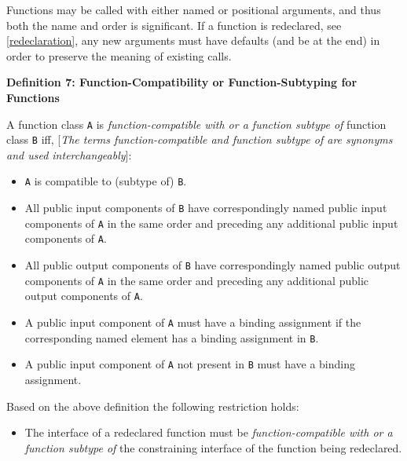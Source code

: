 \begin{nonnormative}
Functions may be called with either named or positional
arguments, and thus both the name and order is significant. If a
function is redeclared, see \autoref{redeclaration}, any new arguments must
have defaults (and be at the end) in order to preserve the meaning of
existing calls.
\end{nonnormative}

\textbf{Definition 7: Function-Compatibility or Function-Subtyping for Functions}

A function class \lstinline!A! is \emph{function-compatible with or a function
subtype of} function class \lstinline!B! iff, {[}\emph{The terms function-compatible
and function subtype of are synonyms and used interchangeably}{]}:
\begin{itemize}
\item
  \lstinline!A! is compatible to (subtype of) \lstinline!B!.
\item
  All public input components of \lstinline!B! have correspondingly named public
  input components of \lstinline!A! in the same order and preceding any additional
  public input components of \lstinline!A!.
\item
  All public output components of \lstinline!B! have correspondingly named public
  output components of \lstinline!A! in the same order and preceding any additional
  public output components of \lstinline!A!.
\item
  A public input component of \lstinline!A! must have a binding assignment if the
  corresponding named element has a binding assignment in \lstinline!B!.
\item
  A public input component of \lstinline!A! not present in \lstinline!B! must have a binding
  assignment.
\end{itemize}

Based on the above definition the following restriction holds:
\begin{itemize}
\item
  The interface of a redeclared function must be
  \emph{function-compatible with or a function subtype of} the
  constraining interface of the function being redeclared.
\end{itemize}

